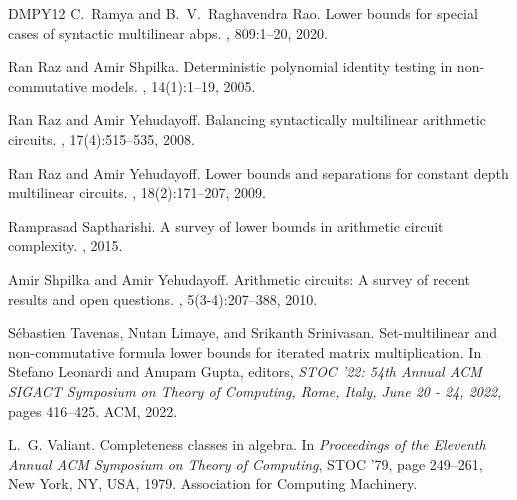 \documentclass[10pt,a4paper]{article}
\theoremstyle{definition}%
\theoremstyle{plain}
\begin{document}
\begin{thebibliography}{DMPY12}
C.~Ramya and B.~V.~Raghavendra Rao.
\newblock Lower bounds for special cases of syntactic multilinear abps.
, 809:1--20, 2020.

Ran Raz and Amir Shpilka.
\newblock Deterministic polynomial identity testing in non-commutative models.
, 14(1):1--19, 2005.

Ran Raz and Amir Yehudayoff.
\newblock Balancing syntactically multilinear arithmetic circuits.
, 17(4):515--535, 2008.

Ran Raz and Amir Yehudayoff.
\newblock Lower bounds and separations for constant depth multilinear circuits.
, 18(2):171--207, 2009.

Ramprasad Saptharishi.
\newblock A survey of lower bounds in arithmetic circuit complexity.
, 2015.

Amir Shpilka and Amir Yehudayoff.
\newblock Arithmetic circuits: {A} survey of recent results and open questions.
, 5(3-4):207--388, 2010.

S{\'{e}}bastien Tavenas, Nutan Limaye, and Srikanth Srinivasan.
\newblock Set-multilinear and non-commutative formula lower bounds for iterated
  matrix multiplication.
\newblock In Stefano Leonardi and Anupam Gupta, editors, {\em {STOC} '22: 54th
  Annual {ACM} {SIGACT} Symposium on Theory of Computing, Rome, Italy, June 20
  - 24, 2022}, pages 416--425. {ACM}, 2022.

L.~G. Valiant.
\newblock Completeness classes in algebra.
\newblock In {\em Proceedings of the Eleventh Annual ACM Symposium on Theory of
  Computing}, STOC '79, page 249–261, New York, NY, USA, 1979. Association
  for Computing Machinery.

\end{thebibliography}
\end{document}
